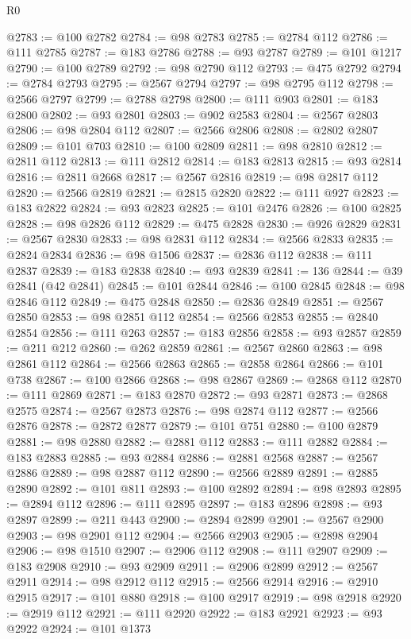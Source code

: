 \begin{lexlean}{R0}
\begin{coremodule}
@2783 := @100 @2782
@2784 := @98 @2783
@2785 := @2784 @112
@2786 := @111 @2785
@2787 := @183 @2786
@2788 := @93 @2787
@2789 := @101 @1217
@2790 := @100 @2789
@2792 := @98 @2790 @112
@2793 := @475 @2792
@2794 := @2784 @2793
@2795 := @2567 @2794
@2797 := @98 @2795 @112
@2798 := @2566 @2797
@2799 := @2788 @2798
@2800 := @111 @903
@2801 := @183 @2800
@2802 := @93 @2801
@2803 := @902 @2583
@2804 := @2567 @2803
@2806 := @98 @2804 @112
@2807 := @2566 @2806
@2808 := @2802 @2807
@2809 := @101 @703
@2810 := @100 @2809
@2811 := @98 @2810
@2812 := @2811 @112
@2813 := @111 @2812
@2814 := @183 @2813
@2815 := @93 @2814
@2816 := @2811 @2668
@2817 := @2567 @2816
@2819 := @98 @2817 @112
@2820 := @2566 @2819
@2821 := @2815 @2820
@2822 := @111 @927
@2823 := @183 @2822
@2824 := @93 @2823
@2825 := @101 @2476
@2826 := @100 @2825
@2828 := @98 @2826 @112
@2829 := @475 @2828
@2830 := @926 @2829
@2831 := @2567 @2830
@2833 := @98 @2831 @112
@2834 := @2566 @2833
@2835 := @2824 @2834
@2836 := @98 @1506
@2837 := @2836 @112
@2838 := @111 @2837
@2839 := @183 @2838
@2840 := @93 @2839
@2841 := 136
@2844 := @39 @2841 (@42 @2841)
@2845 := @101 @2844
@2846 := @100 @2845
@2848 := @98 @2846 @112
@2849 := @475 @2848
@2850 := @2836 @2849
@2851 := @2567 @2850
@2853 := @98 @2851 @112
@2854 := @2566 @2853
@2855 := @2840 @2854
@2856 := @111 @263
@2857 := @183 @2856
@2858 := @93 @2857
@2859 := @211 @212
@2860 := @262 @2859
@2861 := @2567 @2860
@2863 := @98 @2861 @112
@2864 := @2566 @2863
@2865 := @2858 @2864
@2866 := @101 @738
@2867 := @100 @2866
@2868 := @98 @2867
@2869 := @2868 @112
@2870 := @111 @2869
@2871 := @183 @2870
@2872 := @93 @2871
@2873 := @2868 @2575
@2874 := @2567 @2873
@2876 := @98 @2874 @112
@2877 := @2566 @2876
@2878 := @2872 @2877
@2879 := @101 @751
@2880 := @100 @2879
@2881 := @98 @2880
@2882 := @2881 @112
@2883 := @111 @2882
@2884 := @183 @2883
@2885 := @93 @2884
@2886 := @2881 @2568
@2887 := @2567 @2886
@2889 := @98 @2887 @112
@2890 := @2566 @2889
@2891 := @2885 @2890
@2892 := @101 @811
@2893 := @100 @2892
@2894 := @98 @2893
@2895 := @2894 @112
@2896 := @111 @2895
@2897 := @183 @2896
@2898 := @93 @2897
@2899 := @211 @443
@2900 := @2894 @2899
@2901 := @2567 @2900
@2903 := @98 @2901 @112
@2904 := @2566 @2903
@2905 := @2898 @2904
@2906 := @98 @1510
@2907 := @2906 @112
@2908 := @111 @2907
@2909 := @183 @2908
@2910 := @93 @2909
@2911 := @2906 @2899
@2912 := @2567 @2911
@2914 := @98 @2912 @112
@2915 := @2566 @2914
@2916 := @2910 @2915
@2917 := @101 @880
@2918 := @100 @2917
@2919 := @98 @2918
@2920 := @2919 @112
@2921 := @111 @2920
@2922 := @183 @2921
@2923 := @93 @2922
@2924 := @101 @1373

\end{coremodule}
\end{lexlean}
